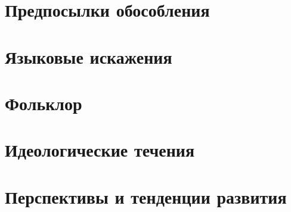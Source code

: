 
\LARGE


\tableofcontents %
\Large

\chapter{Предпосылки обособления}

\chapter{Языковые искажения}

\chapter{Фольклор}

\chapter{Идеологические течения}

\chapter{Перспективы и тенденции развития}



